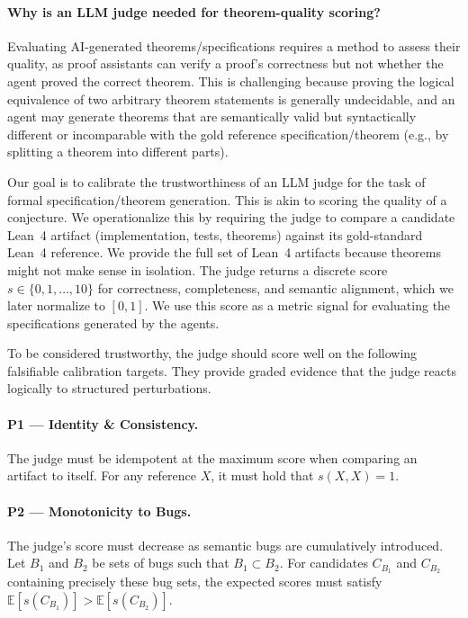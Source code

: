 \documentclass{article}
\begin{document}
\paragraph{Why is an LLM judge needed for theorem-quality scoring?}
Evaluating AI-generated theorems/specifications requires a method to assess their quality, as proof assistants can verify a proof's correctness but not whether the agent proved the correct theorem.
This is challenging because proving the logical equivalence of two arbitrary theorem statements is generally undecidable, and an agent may generate theorems that are semantically valid but syntactically different or incomparable with the gold reference specification/theorem (e.g., by splitting a theorem into different parts).

Our goal is to calibrate the trustworthiness of an LLM judge for the task of formal specification/theorem generation.
This is akin to scoring the quality of a conjecture.
We operationalize this by requiring the judge to compare a candidate Lean~4 artifact (implementation, tests, theorems) against its gold-standard Lean~4 reference.
We provide the full set of Lean~4 artifacts because theorems might not make sense in isolation.
The judge returns a discrete score $s\in\{0,1,\dots,10\}$ for correctness, completeness, and semantic alignment, which we later normalize to $[0,1]$.
We use this score as a metric signal for evaluating the specifications generated by the agents.

To be considered trustworthy, the judge should score well on the following falsifiable calibration targets.
They provide graded evidence that the judge reacts logically to structured perturbations.

\paragraph{P1 — Identity \& Consistency.}
The judge must be idempotent at the maximum score when comparing an artifact to itself.
For any reference $X$, it must hold that $s(X,X)=1$.

\paragraph{P2 — Monotonicity to Bugs.}
The judge’s score must decrease as semantic bugs are cumulatively introduced. Let $B_1$ and $B_2$ be sets of bugs such that $B_1 \subset B_2$. For candidates $C_{B_1}$ and $C_{B_2}$ containing precisely these bug sets, the expected scores must satisfy $\mathbb{E}[s(C_{B_1})] > \mathbb{E}[s(C_{B_2})]$.
\end{document}
